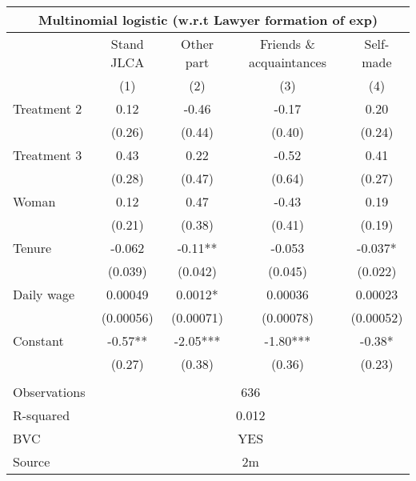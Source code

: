 \begin{tabular}{lcccc}
\multicolumn{5}{c}{Multinomial logistic (w.r.t Lawyer formation of exp)} \\
\midrule
      & Stand JLCA & Other part & Friends \& acquaintances & Self-made \\
\midrule
\midrule
      & (1)   & (2)   & (3)   & (4) \\
\midrule
\midrule
Treatment 2 & 0.12  & -0.46 & -0.17 & 0.20 \\
      & (0.26) & (0.44) & (0.40) & (0.24) \\
Treatment 3 & 0.43  & 0.22  & -0.52 & 0.41 \\
      & (0.28) & (0.47) & (0.64) & (0.27) \\
Woman  & 0.12  & 0.47  & -0.43 & 0.19 \\
      & (0.21) & (0.38) & (0.41) & (0.19) \\
Tenure & -0.062 & -0.11** & -0.053 & -0.037* \\
      & (0.039) & (0.042) & (0.045) & (0.022) \\
Daily wage & 0.00049 & 0.0012* & 0.00036 & 0.00023 \\
      & (0.00056) & (0.00071) & (0.00078) & (0.00052) \\
Constant  & -0.57** & -2.05*** & -1.80*** & -0.38* \\
      & (0.27) & (0.38) & (0.36) & (0.23) \\
      &       &       &       &  \\
\midrule
Observations & \multicolumn{4}{c}{636} \\
R-squared & \multicolumn{4}{c}{0.012} \\
BVC   & \multicolumn{4}{c}{YES} \\
Source & \multicolumn{4}{c}{2m} \\
\bottomrule
\bottomrule
\end{tabular}%
